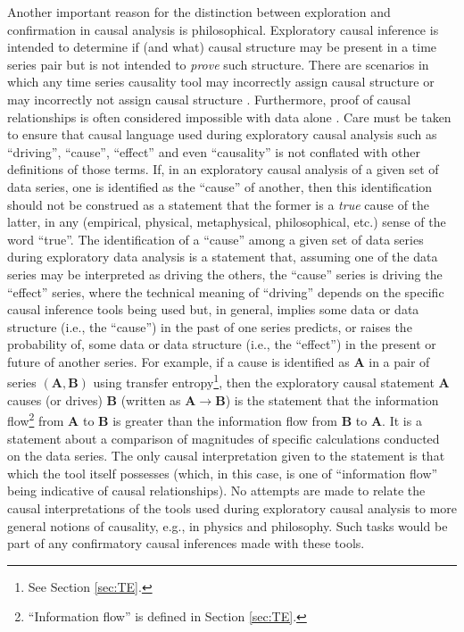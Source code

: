Another important reason for the distinction between exploration and confirmation in causal analysis is philosophical.  Exploratory causal inference is intended to determine if (and what) causal structure may be present in a time series pair but is not intended to {\em prove} such structure.  There are scenarios in which any time series causality tool may incorrectly assign causal structure or may incorrectly not assign causal structure \cite{Illari2014}.  Furthermore, proof of causal relationships is often considered impossible with data alone \cite{Pearl2000,Illari2014,Imbens2015}.  Care must be taken to ensure that causal language used during exploratory causal analysis such as ``driving'', ``cause'', ``effect'' and even ``causality'' is not conflated with other definitions of those terms.  If, in an exploratory causal analysis of a given set of data series, one is identified as the ``cause'' of another, then this identification should not be construed as a statement that the former is a {\em true} cause of the latter, in any (empirical, physical, metaphysical, philosophical, etc.) sense of the word ``true''.  The identification of a ``cause'' among a given set of data series during exploratory data analysis is a statement that, assuming one of the data series may be interpreted as driving the others, the ``cause'' series is driving the ``effect'' series, where the technical meaning of ``driving'' depends on the specific causal inference tools being used but, in general, implies some data or data structure (i.e., the ``cause'') in the past of one series predicts, or raises the probability of, some data or data structure (i.e., the ``effect'') in the present or future of another series.  For example, if a cause is identified as $\mathbf{A}$ in a pair of series $(\mathbf{A},\mathbf{B})$ using transfer entropy\footnote{See Section \ref{sec:TE}.}, then the exploratory causal statement $\mathbf{A}$ causes (or drives) $\mathbf{B}$ (written as $\mathbf{A}\rightarrow\mathbf{B}$) is the statement that the information flow\footnote{``Information flow'' is defined in Section \ref{sec:TE}.} from $\mathbf{A}$ to $\mathbf{B}$ is greater than the information flow from $\mathbf{B}$ to $\mathbf{A}$.  It is a statement about a comparison of magnitudes of specific calculations conducted on the data series.  The only causal interpretation given to the statement is that which the tool itself possesses (which, in this case, is one of ``information flow'' being indicative of causal relationships).  No attempts are made to relate the causal interpretations of the tools used during exploratory causal analysis to more general notions of causality, e.g., in physics and philosophy.  Such tasks would be part of any confirmatory causal inferences made with these tools.

